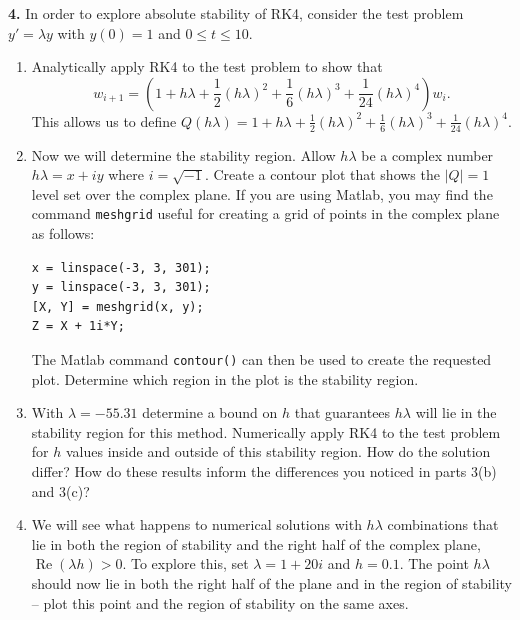 \documentclass[12pt]{amsart}
\begin{document}
\begin{onehalfspace}
        \noindent\textbf{4.} In order to explore absolute stability of RK4, consider the test problem $y'=\lambda y$ with
        $y(0)=1$ and $0\le t\le10$.
        \begin{enumerate}
            \item Analytically apply RK4 to the test problem to show that
            \[
                w_{i+1}=\left(1+h\lambda+\frac12(h\lambda)^2+\frac16(h\lambda)^3+\frac1{24}(h\lambda)^4\right)w_i.
            \]
            This allows us to define $Q(h\lambda)=1+h\lambda+\frac12(h\lambda)^2+\frac16(h\lambda)^3+\frac1{24}(h\lambda)^4$.
            \item Now we will determine the stability region. Allow $h\lambda$ be a complex number
            $h\lambda=x+iy$ where $i=\sqrt{-1}$. Create a contour plot that shows the $|Q|=1$ level
            set over the complex plane. If you are using Matlab, you may find the command
            \texttt{meshgrid} useful for creating a grid of points in the complex plane as follows:
            \begin{lstlisting}[basicstyle=\ttfamily\small,xleftmargin=2.6em]
% Define the grid for the complex plane (z = h*lambda)
x = linspace(-3, 3, 301);
y = linspace(-3, 3, 301);
[X, Y] = meshgrid(x, y);
Z = X + 1i*Y;
            \end{lstlisting}
            \vspace{13pt}
            The Matlab command \texttt{contour()} can then be used to create the requested plot.
            Determine which region in the plot is the stability region.

            \item With $\lambda=-55.31$ determine a bound on $h$ that guarantees $h\lambda$ will lie in the
            stability region for this method. Numerically apply RK4 to the test problem for
            $h$ values inside and outside of this stability region. How do the solution differ?
            How do these results inform the differences you noticed in parts 3(b) and 3(c)?

            \item We will see what happens to numerical solutions with $h\lambda$ combinations that lie in
            both the region of stability and the right half of the complex plane, $\operatorname{Re}(\lambda h)>0$.
            To explore this, set $\lambda=1+20i$ and $h=0.1$. The point $h\lambda$ should now lie in both
            the right half of the plane and in the region of stability -- plot this point and the
            region of stability on the same axes.


\end{enumerate}
\end{onehalfspace}
\end{document}

